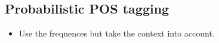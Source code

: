 \documentclass[11pt]{article}
\begin{document}
\subsection{Probabilistic POS tagging}

\begin{minipage}[l]{.5\linewidth}
    \begin{figure}[H]
        \centering
    \end{figure}    
\end{minipage}\hfill
\begin{minipage}[r]{.48\linewidth}
    \begin{itemize}
        \item Use the frequences but take the context into account.
    \end{itemize}
\end{minipage}
\end{document}
